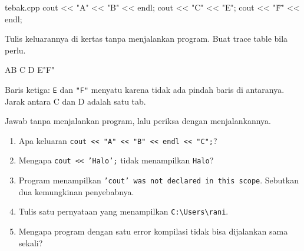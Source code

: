 \documentclass[a4paper]{article}
\begin{document}
\begin{MKode}{tebak.cpp}
cout << "A" << "B" << endl;
cout << "C\tD\n" << "E";
cout << "\"F\"" << endl;
\end{MKode}
\begin{Tebak}[]
Tulis keluarannya di kertas tanpa menjalankan program. Buat trace table bila perlu.
\end{Tebak}
\begin{Jawaban}[]
\begin{MKeluaran}[]
AB
C       D
E"F"
\end{MKeluaran}
Baris ketiga: \texttt{E} dan \texttt{"F"} menyatu karena tidak ada pindah baris di antaranya. Jarak antara C dan D adalah satu tab.
\end{Jawaban}
\par\vspace{4pt}\par\vspace{6pt}
Jawab tanpa menjalankan program, lalu periksa dengan menjalankannya.
\begin{enumerate}
\item Apa keluaran \texttt{cout << "A" << "B" << endl << "C";}?
\item Mengapa \texttt{cout << 'Halo';} tidak menampilkan \texttt{Halo}?
\item Program menampilkan \texttt{'cout' was not declared in this scope}. Sebutkan dua kemungkinan penyebabnya.
\item Tulis satu pernyataan yang menampilkan \texttt{C:\textbackslash{}Users\textbackslash{}rani}.
\item Mengapa program dengan satu error kompilasi tidak bisa dijalankan sama sekali?
\end{enumerate}
\end{document}
